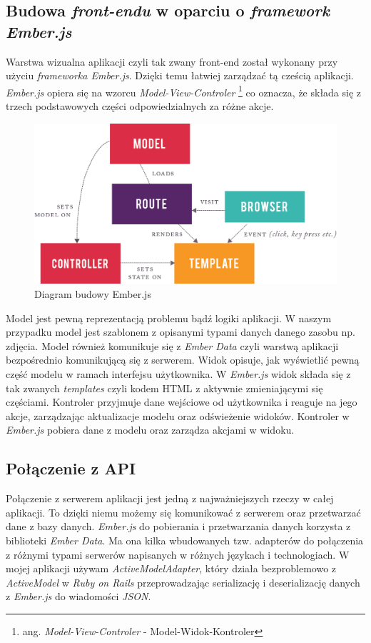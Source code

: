 \documentclass[openright]{xmgr}
\begin{document}
\subsection{Budowa \textit{front-endu} w oparciu o \textit{framework Ember.js} }
Warstwa wizualna aplikacji czyli tak zwany front-end został wykonany przy użyciu \textit{frameworka Ember.js}. Dzięki temu łatwiej zarządzać tą cześcią aplikacji. \textit{Ember.js} opiera się na wzorcu \textit{Model-View-Controler} \footnote{ang. \textit{Model-View-Controler} -  Model-Widok-Kontroler} co oznacza, że składa się z trzech podstawowych części odpowiedzialnych za różne akcje. 
\begin{figure}[H]
\centering
\includegraphics[width=0.7\hsize]{images/ember.png}
\caption{Diagram budowy Ember.js\label{RYS.1}}
\end{figure}
Model  jest pewną reprezentacją problemu bądź logiki aplikacji. W naszym przypadku model jest szablonem z opisanymi typami danych danego zasobu np. zdjęcia. Model również komunikuje się z \textit{Ember Data} czyli warstwą aplikacji bezpośrednio komunikującą się z serwerem.  Widok opisuje, jak wyświetlić pewną część modelu w ramach interfejsu użytkownika. W \textit{Ember.js} widok składa się z tak zwanych \textit{templates} czyli kodem HTML z aktywnie zmieniającymi się częściami. Kontroler przyjmuje dane wejściowe od użytkownika i reaguje na jego akcje, zarządzając aktualizacje modelu oraz odświeżenie widoków. Kontroler w \textit{Ember.js} pobiera dane z modelu oraz zarządza akcjami w widoku.

\subsection{Połączenie z API}
Połączenie z serwerem aplikacji jest jedną z najważniejszych rzeczy w całej aplikacji. To dzięki niemu możemy się komunikować z serwerem oraz przetwarzać dane z bazy danych. \textit{Ember.js} do pobierania i przetwarzania danych korzysta z biblioteki \textit{Ember Data}. Ma ona kilka wbudowanych tzw. adapterów do połączenia z różnymi typami serwerów napisanych w różnych językach i technologiach. W mojej aplikacji używam \textit{ActiveModelAdapter}, który działa bezproblemowo z \textit{ActiveModel} w \textit{Ruby on Rails} przeprowadzając serializację i deserializację danych z \textit{Ember.js} do wiadomości \textit{JSON}.
\end{document}
